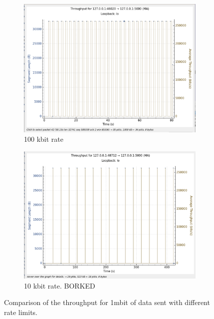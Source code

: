 \documentclass{report}
\begin{document}
\begin{figure}[H]
    \begin{subfigure}[b]{0.45\textwidth}
        \centering
        \includegraphics[width=\textwidth]{Pics/Cubic/r100kbit_s1m_th}
        \caption{100 kbit rate}
    \end{subfigure}
    \hfill
    \begin{subfigure}[b]{0.45\textwidth}
        \centering
        \includegraphics[width=\textwidth]{Pics/Cubic/r10kbit_s1m_th}
        \caption{10 kbit rate. BORKED}
    \end{subfigure}
    \caption{Comparison of the throughput for 1mbit of data sent with different rate limits.}
    \label{fig:four_images}
\end{figure}
\end{document}
